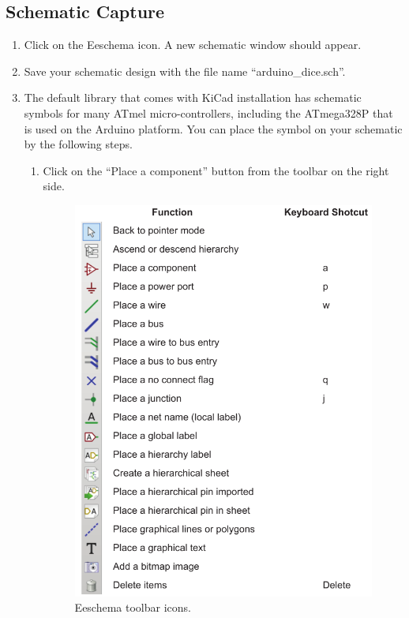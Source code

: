 \documentclass[12pt,letterpaper]{scrartcl}
\begin{document}
\subsection{Schematic Capture}

\begin{enumerate}
	\item Click on the Eeschema icon. A new schematic window should appear.
	\item Save your schematic design with the file name ``arduino\_dice.sch''. 
	\item The default library that comes with KiCad installation has schematic symbols for many ATmel micro-controllers, including the ATmega328P that is used on the Arduino platform. You can place the symbol on your schematic by the following steps. 
		\begin{enumerate}
			\item Click on the ``Place a component'' button from the toolbar on the right side.
			
				\begin{figure}[h]
					\centering
					\includegraphics{eeschema-toolbar}
					\caption{Eeschema toolbar icons.}
					\label{fig:eeschema-toolbar}
				\end{figure}
				

\end{enumerate}
\end{enumerate}
\end{document}
